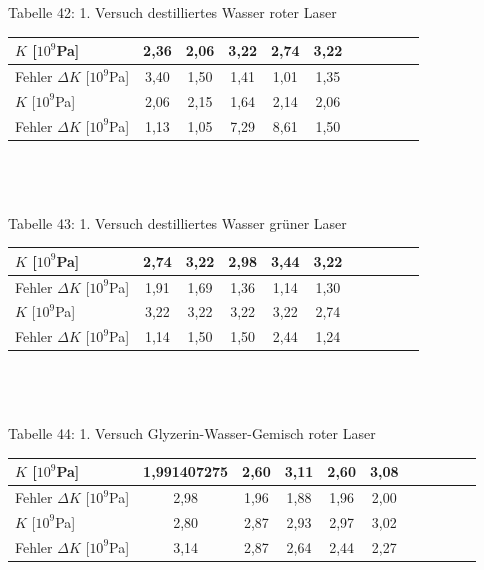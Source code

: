 \documentclass[fontsize=12pt]{scrartcl}
\begin{document}
~\\
~\\
Tabelle 42: 1. Versuch destilliertes Wasser roter Laser  \\
\begin{tabular}{|l|c|c|c|c|c|c|c|c|c|c|} \hline
$K$ [$10^9$Pa] & 2,36 & 2,06 & 3,22 & 2,74 & 3,22  \\ \hline
Fehler $\Delta K$ [$10^9$Pa] & 3,40 &
1,50 & 
1,41 & 
1,01 & 
1,35 
  \\ \hline
$K$ [$10^9$Pa] & 2,06 & 2,15 & 1,64 & 2,14 & 2,06  \\ \hline
Fehler $\Delta K$ [$10^9$Pa] & 
1,13 & 
1,05 & 
7,29 & 
8,61 & 
1,50 \\ \hline
\end{tabular} \\

~\\
~\\ 
Tabelle 43: 1. Versuch destilliertes Wasser grüner Laser \\
\begin{tabular}{|l|c|c|c|c|c|c|c|c|c|c|} \hline
 $K$ [$10^9$Pa] & 2,74 & 3,22 & 2,98 & 3,44 & 3,22   \\ \hline
Fehler  $\Delta K$ [$10^9$Pa] & 1,91 & 
1,69 & 
1,36 & 
1,14 & 
1,30  \\ \hline
 $K$ [$10^9$Pa] & 3,22 & 3,22 & 3,22 & 3,22 & 2,74   \\ \hline
Fehler  $\Delta K$ [$10^9$Pa] &  1,14 & 
1,50 & 
1,50 & 
2,44 & 
1,24 
\\ \hline 
\end{tabular} \\

~\\
~\\ 
Tabelle 44: 1. Versuch Glyzerin-Wasser-Gemisch roter Laser \\
\begin{tabular}{|l|c|c|c|c|c|c|c|c|c|c|} \hline
 $K$ [$10^9$Pa] & 1,991407275 & 2,60 & 3,11 & 2,60 & 3,08  \\ \hline
Fehler $\Delta K$ [$10^9$Pa] &  2,98  & 
1,96 & 
1,88 & 
1,96 & 
2,00
\\ \hline

 $K$ [$10^9$Pa] & 2,80 & 2,87 & 2,93 & 2,97 & 3,02 \\ \hline
Fehler $\Delta K$ [$10^9$Pa] & 3,14 & 
2,87 & 
2,64 & 
2,44 & 
2,27
  \\ \hline
\end{tabular} \\
\end{document}

